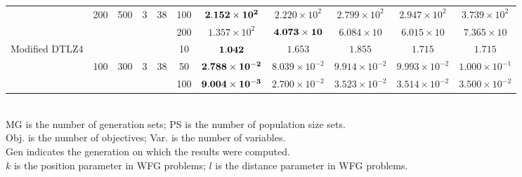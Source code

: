 \documentclass[../main/main]{subfiles}
\begin{document}
\begin{table}[htbp]
\begin{tabular}{c|ccccc|c|c|c|c|c}
  				   & 200 & 500 & 3 & 38 &100 &$\bf{2.152 \times 10^{2}}$ &  $2.220 \times 10^{2}$ & $2.799 \times 10^{2}$ & $2.947 \times 10^{2}$ & $3.739 \times 10^{2}$\\
				   &        &      &&  &200 & $1.357 \times 10^{2}$ & $\bf{4.073 \times 10}$ & $6.084 \times 10$ & $6.015 \times 10$ & $7.365 \times 10$\\
\hline
\multirow{3}{*}{\fontsize{6.5pt}{0pt}\selectfont Modified DTLZ4} & &&       &       & 10 &$\bf{1.042}$ & $1.653$ & $1.855$ & $1.715$ & $1.715$\\
  				   & 100 & 300 & 3 & 38 &50 &$\bf{2.788 \times 10^{-2}}$ &  $8.039 \times 10^{-2}$ & $9.914 \times 10^{-2}$ & $9.993 \times 10^{-2}$ & $1.000 \times 10^{-1}$\\
				   &        &      &&  &100 & $\bf{9.004 \times 10^{-3}}$ & $2.700 \times 10^{-2}$ & $3.523 \times 10^{-2}$ & $3.514 \times 10^{-2}$ & $3.500 \times 10^{-2}$\\

\hline

\hline\end{tabular}
\\
{\footnotesize MG is the number of generation sets; PS is the number of population size sets.}\\
{\footnotesize Obj. is the number of objectives; Var. is the number of variables.}\\
{\footnotesize Gen indicates the generation on which the results were computed.} \\
{\footnotesize $k$ is the position parameter in WFG problems; $l$ is the distance parameter in WFG problems.}\\
\end{table}
\end{document}
